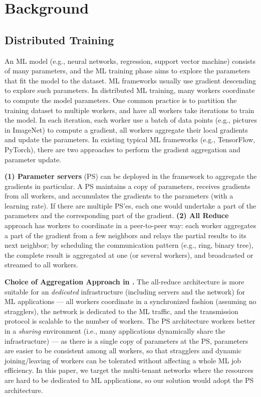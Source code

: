 \section{Background}
\subsection{Distributed Training}
An ML model (e.g., neural networks, regression, support vector machine) 
consists of many parameters, and the ML training phase aims to explore the 
parameters that fit the model to the dataset. ML frameworks usually use 
gradient descending to explore such parameters.
In distributed ML training, many workers coordinate to compute the model parameters. 
One common practice is to partition the training dataset to multiple workers,
and have all workers take iterations to train the model.
In each iteration, each worker use a batch of data points (e.g., pictures in ImageNet)
to compute a gradient, all workers aggregate their local gradients and update the parameters.
In existing typical ML frameworks (e.g., TensorFlow, PyTorch),
there are two approaches to perform the gradient aggregation and parameter update.

\textbf{(1) Parameter servers} (PS) can be deployed in the framework to aggregate the gradients 
in particular. A PS maintains a copy of parameters, receives gradients from all workers, and accumulates the gradients to the parameters (with a learning rate). If there are multiple PS'es,
each one would undertake a part of the parameters and the corresponding part of the gradient.
\textbf{(2) All Reduce} approach has workers to coordinate in a peer-to-peer way: each worker 
aggregates a part of the gradient from a few neighbors and relays the partial results to its next neighbor;
by scheduling the communication pattern (e.g., ring, binary tree), the complete result
is aggregated at one (or several workers), and broadcasted or streamed to all workers.




\textbf{Choice of Aggregation Approach in \sysname.} The all-reduce architecture is more suitable for 
an \emph{dedicated} infrastructure (including servers and the network) for ML applications ---
all workers coordinate in a synchronized fashion (assuming no stragglers), the
network is dedicated to the ML traffic, and the transmission protocol is scalable to the
number of workers. The PS architecture workers better in a \emph{sharing} environment
(i.e., many applications dynamically share the infrastructure) --- 
as there is a single copy of parameters at the PS, parameters are easier to be consistent
among all workers, so that stragglers and dynamic joining/leaving of workers can be tolerated
without affecting a whole ML job efficiency. In this paper, we target the multi-tenant networks
where the resources are hard to be dedicated to ML applications, so our solution would 
adopt the PS architecture.
 

